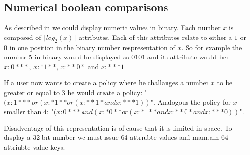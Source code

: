 \subsection{Numerical boolean comparisons}
As described in \cite{bethencourt2007ciphertext} we could display numeric values in binary. Each number $x$ is composed of $\lceil log_2(x) \rceil$ attributes. Each of this attributes relate to either a $1$ or $0$ in one position in the binary number respresentation of $x$. So for example the number $5$ in binary would be displayed as $0101$ and its attribute would be: $x:0***$, $x:*1**$, $x:**0*$ and $x:***1$. 

If a user now wants to create a policy where he challanges a number $x$ to be greater or equal to $3$ he would create a policy: "$(x:1*** or (x:*1** or (x:**1* and x:***1))$". Analogous the policy for $x$ smaller than $4$: "$(x:0*** and (x:*0** or (x:*1** and x:**0* and x:***0))$".

Disadventage of this representation is of cause that it is limited in space. To display a 32-bit number we must issue 64 attriubte values and maintain 64 attriubte value keys. 
